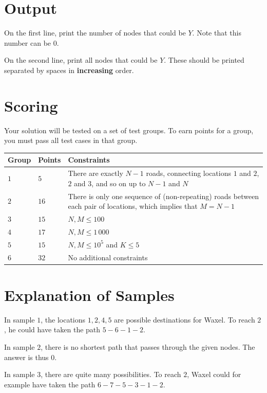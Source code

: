 \section*{Output}
On the first line, print the number of nodes that could be $Y$.
Note that this number can be $0$.

On the second line, print all nodes that could be $Y$.
These should be printed separated by spaces in \textbf{increasing} order.

\section*{Scoring}
Your solution will be tested on a set of test groups.
To earn points for a group, you must pass all test cases in that group.

\noindent
\begin{tabular}{| l | l | p{10cm} |}
\hline
Group & Points & Constraints \\ \hline
$1$    & $5$         & There are exactly $N - 1$ roads, connecting locations $1$ and $2$, $2$ and $3$, and so on up to $N - 1$ and $N$ \\ \hline
$2$    & $16$         & There is only one sequence of (non-repeating) roads between each pair of locations, which implies that $M = N - 1$ \\ \hline
$3$    & $15$         & $N,M \leq 100$ \\ \hline
$4$    & $17$         & $N,M \leq 1\,000$ \\ \hline
$5$    & $15$         & $N,M \leq 10^5$ and $K \leq 5$ \\ \hline
$6$    & $32$         & No additional constraints \\ \hline
\end{tabular}

\section*{Explanation of Samples}
In sample $1$, the locations $1,2,4,5$ are possible destinations for Waxel.
To reach $2$, he could have taken the path $5-6-1-2$.

In sample $2$, there is no shortest path that passes through the given nodes.
The answer is thus $0$.

In sample $3$, there are quite many possibilities.
To reach $2$, Waxel could for example have taken the path $6-7-5-3-1-2$.
